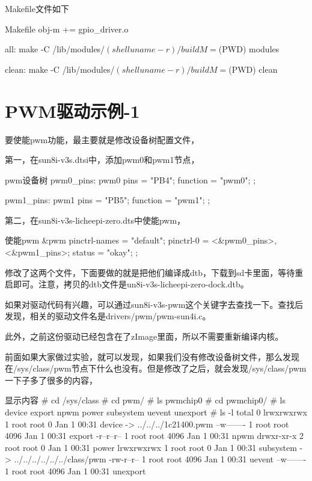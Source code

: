 \documentclass[lang=cn,newtx,10pt,scheme=chinese]{elegantbook}
\begin{document}
Makefile文件如下

\begin{mycode}{Makefile}
obj-m += gpio_driver.o

all:
    make -C /lib/modules/$(shell uname -r)/build M=$(PWD) modules

clean:
    make -C /lib/modules/$(shell uname -r)/build M=$(PWD) clean
\end{mycode}

\chapter{PWM驱动示例-1}

要使能pwm功能，最主要就是修改设备树配置文件，

第一，在sun8i-v3s.dtsi中，添加pwm0和pwm1节点，

\begin{mycode}{pwm设备树}
pwm0_pins: pwm0 {
    pins = "PB4";
    function = "pwm0";
};

pwm1_pins: pwm1 {
    pins = "PB5";
    function = "pwm1";
};
\end{mycode}

第二，在sun8i-v3s-licheepi-zero.dts中使能pwm，

\begin{mycode}{使能pwm}
&pwm {
    pinctrl-names = "default";
    pinctrl-0 = <&pwm0_pins>, <&pwm1_pins>;
    status = "okay";
};
\end{mycode}

修改了这两个文件，下面要做的就是把他们编译成dtb，下载到sd卡里面，等待重启即可。注意，拷贝的dtb文件是un8i-v3s-licheepi-zero-dock.dtb。

如果对驱动代码有兴趣，可以通过sun8i-v3s-pwm这个关键字去查找一下。查找后发现，相关的驱动文件名是drivers/pwm/pwm-sun4i.c。

此外，之前这份驱动已经包含在了zImage里面，所以不需要重新编译内核。

前面如果大家做过实验，就可以发现，如果我们没有修改设备树文件，那么发现在/sys/class/pwm节点下什么也没有。但是修改了之后，就会发现/sys/class/pwm一下子多了很多的内容，

\begin{mycode}{显示内容}
# cd /sys/class
# cd pwm/
# ls
pwmchip0
# cd pwmchip0/
# ls
device     export     npwm       power      subsystem  uevent     unexport
# ls -l
total 0
lrwxrwxrwx    1 root     root             0 Jan  1 00:31 device -> ../../../1c21400.pwm
--w-------    1 root     root          4096 Jan  1 00:31 export
-r--r--r--    1 root     root          4096 Jan  1 00:31 npwm
drwxr-xr-x    2 root     root             0 Jan  1 00:31 power
lrwxrwxrwx    1 root     root             0 Jan  1 00:31 subsystem -> ../../../../../../class/pwm
-rw-r--r--    1 root     root          4096 Jan  1 00:31 uevent
--w-------    1 root     root          4096 Jan  1 00:31 unexport
\end{mycode}
\end{document}
